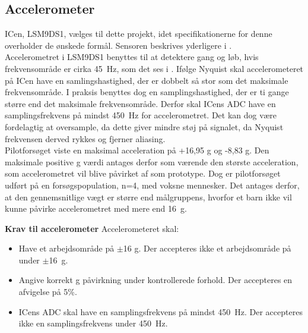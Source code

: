 \subsection{Accelerometer}\label{krav:acc}
ICen, LSM9DS1, vælges til dette projekt, idet specifikationerne for denne overholder de ønskede formål. Sensoren beskrives yderligere i . \\
Accelerometret i LSM9DS1 benyttes til at detektere gang og løb, hvis frekvensområde er cirka 45~Hz, som det ses i . Ifølge Nyquist skal accelerometeret på ICen have en samlingshastighed, der er dobbelt så stor som det maksimale frekvensområde. %
I praksis benyttes dog en samplingshastighed, der er ti gange større end det maksimale frekvensområde. Derfor skal ICens ADC have en samplingsfrekvens på mindst 450~Hz for accelerometret. Det kan dog være fordelagtig at oversample, da dette giver mindre støj på signalet, da Nyquist frekvensen derved rykkes og fjerner aliasing. \citep{Webster2011} \\
Pilotforsøget viste en maksimal acceleration på +16,95 g og -8,83 g. Den maksimale positive g værdi antages derfor som værende den største acceleration, som accelerometret vil blive påvirket af som prototype. Dog er pilotforsøget udført på en forsøgspopulation, n=4, med voksne mennesker. Det antages derfor, at den gennemsnitlige vægt er større end målgruppens, hvorfor et barn ikke vil kunne påvirke accelerometret med mere end 16~g. 

\textbf{Krav til accelerometer} \newline 
Accelerometeret skal:
\begin{itemize}
\item Have et arbejdsområde på $\pm$16 g. Der accepteres ikke et arbejdsområde på under $\pm$16~g.
\item Angive korrekt g påvirkning under kontrollerede forhold. Der accepteres en afvigelse på 5\%.
\item ICens ADC skal have en samplingsfrekvens på mindst 450~Hz. Der accepteres ikke en samplingsfrekvens under 450~Hz.
\end{itemize}

